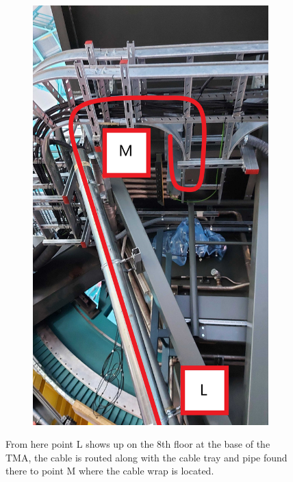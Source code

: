 \begin{figure}
\begin{subfigure}{0.40\textwidth}
      \includegraphics[width=\textwidth]{images/27-1.jpg}
    \end{subfigure}
    \caption*{From here point L shows up on the 8th floor at the base of the TMA, the cable is routed along with the cable tray and pipe found there to point M where the cable wrap is located.}
  \end{figure}

